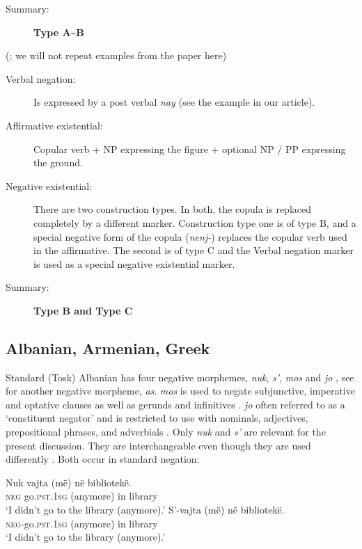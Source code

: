 \documentclass[output=paper,colorlinks,citecolor=brown]{langscibook}
\begin{document}
\begin{paperappendix}
\begin{unindented}
\begin{description}
\item[Summary:] \textbf{Type A{\textasciitilde}B}
\end{description}
 (\cites{Christmas1973a}{Christmas1973b}; we will not repeat examples from the paper here)

\begin{description}
\item[Verbal negation:] Is expressed by a post verbal \textit{nay} (see the example in our article). 

\item[Affirmative existential:] Copular verb + NP expressing the figure + optional NP / PP expressing the ground.

\item[Negative existential:] There are two construction types. In both, the copula is replaced completely by a different marker. Construction type one is of type B, and a special negative form of the copula (\textit{nenj-}) replaces the copular verb used in the affirmative. The second is of type C and the Verbal negation marker is used as a special negative existential marker.

\item[Summary:] \textbf{Type B and Type C}
\end{description}

\subsection{Albanian, Armenian, Greek}%


Standard (Tosk) Albanian has four negative morphemes, \textit{nuk},
\textit{s’}, \textit{mos} and \textit{jo} \citep[82]{Turano2000}, see
\citet[172]{BuchholzFiedler1987} for another negative morpheme,
\textit{as}. \textit{mos} is used to negate subjunctive, imperative and
optative clauses as well as gerunds and infinitives \citep[85]{Turano2000}.
\textit{jo} often referred to as a `constituent negator' and is restricted
to use with nominals, adjectives, prepositional phrases, and adverbials
\citep[86]{Turano2000}. Only \textit{nuk} and \textit{s’} are relevant for
the present discussion. They are interchangeable even though they are used
differently \parencite[172]{BuchholzFiedler1987}. Both occur in standard negation:
%
\begin{exe}\ex \gll Nuk vajta (më) në bibliotekë.  \\
\textsc{neg} go.\textsc{pst.1sg} (anymore) in library \\
    \glt `I didn't go to the library (anymore).' \citep[82]{Turano2000}
\ex \gll S’-vajta (më) në bibliotekë.  \\
\textsc{neg}-go.\textsc{pst}.\textsc{1sg} (anymore) in library \\
    \glt `I didn't go to the library (anymore).' \citep[82]{Turano2000}
    \end{exe}


\end{unindented}
\end{paperappendix}
\end{document}

